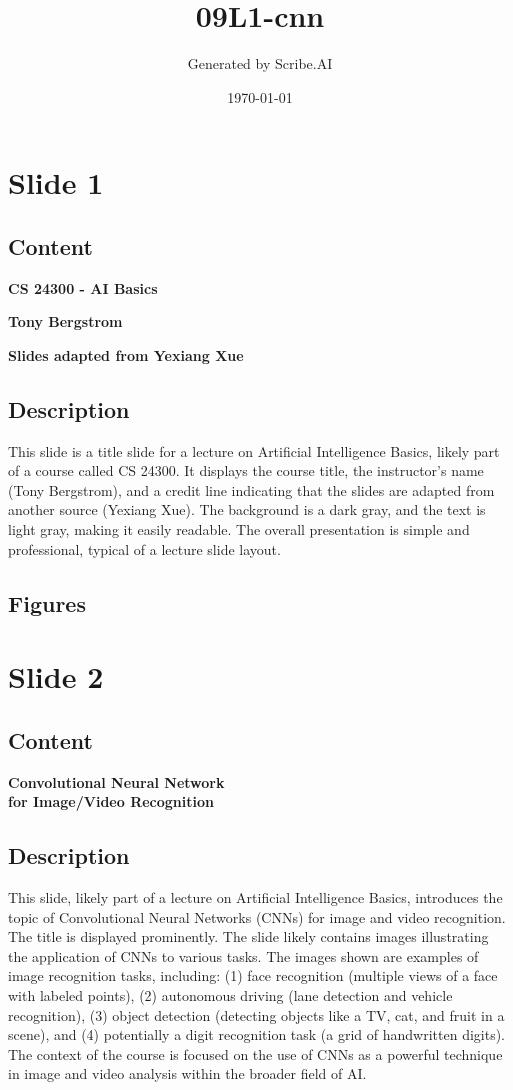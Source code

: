 \documentclass{article}%
\title{09L1{-}cnn}%
\author{Generated by Scribe.AI}%
\date{\today}%
\begin{document}
%
\normalsize%
\maketitle%
\section{Slide 1}%
\label{sec:Slide1}%
\subsection{Content}%

\textbf{CS 24300 - AI Basics}

\textbf{Tony Bergstrom}

\textbf{Slides adapted from Yexiang Xue}
%
\subsection{Description}%
This slide is a title slide for a lecture on Artificial Intelligence Basics, likely part of a course called CS 24300.  It displays the course title, the instructor's name (Tony Bergstrom), and a credit line indicating that the slides are adapted from another source (Yexiang Xue).  The background is a dark gray, and the text is light gray, making it easily readable.  The overall presentation is simple and professional, typical of a lecture slide layout.%
\subsection{Figures}%
\begin{figure}[H]%
\centering%
\end{figure}

%
\newpage%
\section{Slide 2}%
\label{sec:Slide2}%
\subsection{Content}%

\textbf{Convolutional Neural Network} \\
\textbf{for Image/Video Recognition}
%
\subsection{Description}%
This slide, likely part of a lecture on Artificial Intelligence Basics, introduces the topic of Convolutional Neural Networks (CNNs) for image and video recognition.  The title is displayed prominently.  The slide likely contains images illustrating the application of CNNs to various tasks.  The images shown are examples of image recognition tasks, including:  (1) face recognition (multiple views of a face with labeled points), (2) autonomous driving (lane detection and vehicle recognition), (3) object detection (detecting objects like a TV, cat, and fruit in a scene), and (4) potentially a digit recognition task (a grid of handwritten digits).  The context of the course is focused on the use of CNNs as a powerful technique in image and video analysis within the broader field of AI.%
\end{document}
